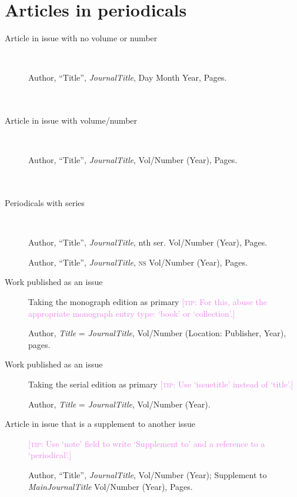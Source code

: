 \documentclass[extrafontsizes,11pt,a4paper,oneside]{memoir}
\newcommand*{\lit}[1]{\textsf{#1}}
\newcommand*{\code}[1]{`\textsf{#1}'}
\newcommand*{\aside}[1]{\textcolor{violet}{[\textsc{tip:} #1]}}
\begin{document}
\chapter{Articles in periodicals}\label{sec:article}

\begin{description}
  \item[Article in issue with no volume or number]~
  \par Author, \enquote{Title}, \emph{JournalTitle}, Day Month Year, Pages.
  \\
  \\
  \\
  
  \item[Article in issue with volume/number]~
  \par Author, \enquote{Title}, \emph{JournalTitle}, Vol/Number (Year), Pages.
  \\
  \\
  \\
  
  \item[Periodicals with series]~
  \par Author, \enquote{Title}, \emph{JournalTitle}, nth \lit{ser}. Vol/Number (Year), Pages.
  \par Author, \enquote{Title}, \emph{JournalTitle}, \textsc{ns} Vol/Number (Year), Pages.
  \\
  
  \item[Work published as an issue] Taking the monograph edition as primary \aside{For this, abuse the appropriate monograph entry type: \code{book} or \code{collection}.}
  \par Author, \emph{Title} = \emph{JournalTitle}, Vol/Number (Location: Publisher, Year), pages.
  \\
  
  \item[Work published as an issue] Taking the serial edition as primary \aside{Use \code{issuetitle} instead of \code{title}.}
  \par Author, \emph{Title} = \emph{JournalTitle}, Vol/Number (Year).
  \\
  
  \item[Article in issue that is a supplement to another issue] \aside{Use \code{note} field to write ‘Supplement to’ and a reference to a \code{periodical}.}
  \par Author, \enquote{Title}, \emph{JournalTitle}, Vol/Number (Year); \lit{Supplement to} \emph{MainJournalTitle} Vol/Number (Year), Pages.
  \\
  

\end{description}
\end{document}
